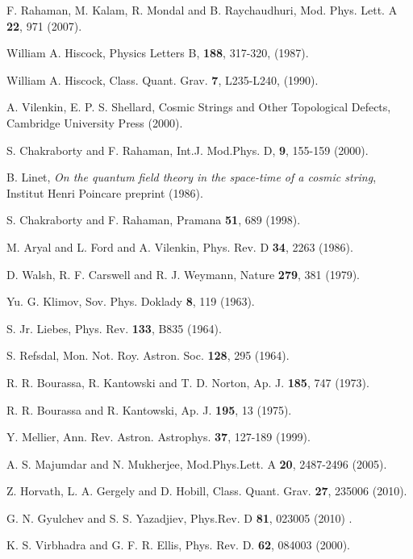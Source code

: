 \documentclass[preprint,superscriptaddress,amsfonts,amssymb,amsmath,showpacs]{revtex4}
\begin{document}
\begin{thebibliography}{99}
   F. Rahaman, M. Kalam, R. Mondal and B. Raychaudhuri,  Mod. Phys. Lett. A \textbf{22}, 971 (2007).

  William  A. Hiscock,  Physics Letters B, \textbf{188}, 317-320, (1987).

  William  A. Hiscock, Class. Quant. Grav. \textbf{7}, L235-L240, (1990).  

    A. Vilenkin, E. P. S. Shellard, Cosmic Strings and Other Topological Defects,  Cambridge University Press  (2000).

 S. Chakraborty and F. Rahaman, Int.J. Mod.Phys. D, \textbf{9}, 155-159 (2000).

 B. Linet, \textit{On the quantum field theory in the space-time of a
cosmic string}, Institut Henri Poincare preprint (1986).

 S. Chakraborty and F. Rahaman, Pramana \textbf{51}, 689 (1998).

  M. Aryal and L. Ford and A. Vilenkin, Phys. Rev. D \textbf{34}, 2263 (1986).

 D. Walsh, R. F. Carswell and R. J. Weymann, Nature \textbf{279}, 381 (1979).

 Yu. G. Klimov, Sov. Phys. Doklady \textbf{8}, 119 (1963).

 S. Jr. Liebes, Phys. Rev. \textbf{133}, B835 (1964).

 S. Refsdal, Mon. Not. Roy. Astron. Soc.  \textbf{128}, 295 (1964).

  R. R. Bourassa, R. Kantowski and T. D. Norton, Ap. J. \textbf{185}, 747 (1973).

 R. R. Bourassa and R. Kantowski, Ap. J. \textbf{195}, 13 (1975).

 Y. Mellier, Ann. Rev. Astron. Astrophys. \textbf{37}, 127-189 (1999). 

  A. S. Majumdar and  N. Mukherjee, Mod.Phys.Lett. A \textbf{20}, 2487-2496 (2005). 

 Z. Horvath, L. A. Gergely and D. Hobill,  Class. Quant. Grav. \textbf{27}, 235006 (2010).

  G. N. Gyulchev and S. S. Yazadjiev, Phys.Rev. D \textbf{81}, 023005 (2010) .

 K. S. Virbhadra and G. F. R. Ellis, Phys. Rev. D. \textbf{62}, 084003 (2000).


\end{thebibliography}
\end{document}
